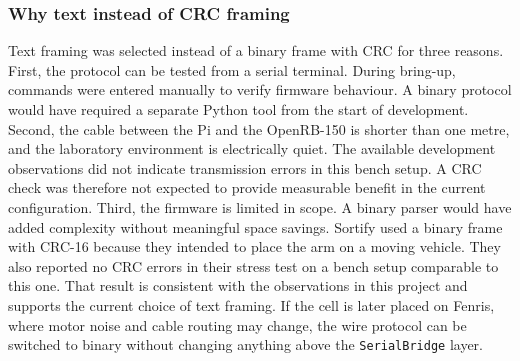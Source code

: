 \subsubsection*{Why text instead of CRC framing}
Text framing was selected instead of a binary frame with CRC for three
reasons.
First, the protocol can be tested from a serial terminal. During
bring-up, commands were entered manually to verify firmware behaviour. A
binary protocol would have required a separate Python tool from the
start of development.
Second, the cable between the Pi and the OpenRB-150 is shorter than
one metre, and the laboratory environment is electrically quiet. The
available development observations did not indicate transmission errors
in this bench setup. A CRC check was therefore not expected to provide
measurable benefit in the current configuration.
Third, the firmware is limited in scope. A binary parser would have
added complexity without meaningful space savings.
Sortify \cite{sortify} used a binary frame with CRC-16 because they
intended to place the arm on a moving vehicle. They also reported no CRC
errors in their stress test on a bench setup comparable to this one.
That result is consistent with the observations in this project and
supports the current choice of text framing. If the cell is later placed
on Fenris, where motor noise and cable routing may change, the wire
protocol can be switched to binary without changing anything above the
\texttt{SerialBridge} layer.
